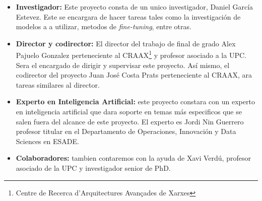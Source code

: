 \begin{itemize}
    \item \textbf{Investigador:} Este proyecto consta de un unico investigador, Daniel García Estevez. Este se encargara de hacer tareas tales como la investigación de modelos a 
                                 a utilizar, metodos de \textit{fine-tuning}, entre otras.
    \item \textbf{Director y codirector:} El director del trabajo de final de grado Alex Pajuelo Gonzalez perteneciente al CRAAX\footnote{Centre de Recerca d'Arquitectures Avançades de Xarxes}
                                          y profesor asociado a la UPC. Sera el encargado de dirigir y supervisar este proyecto. Así mismo, el codirector del proyecto Juan José Costa Prats 
                                          perteneciente al CRAAX, ara tareas similares al director.
    \item \textbf{Experto en Inteligencia Artificial:} este proyecto constara con un experto en inteligencia artificial que dara soporte en temas más especificos que se salen fuera del alcance de
                                                       este proyecto. El experto es Jordi Nin Guerrero profesor titular en el Departamento de Operaciones, Innovación y Data Sciences en ESADE.
    \item \textbf{Colaboradores:} tambien contaremos con la ayuda de Xavi Verdú, profesor asociado de la UPC y investigador senior de PhD.
\end{itemize}